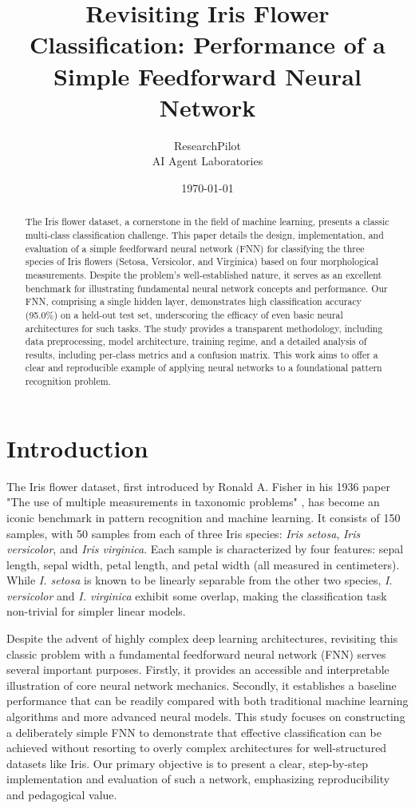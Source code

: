 \documentclass[12pt,a4paper]{article}
\title{Revisiting Iris Flower Classification: Performance of a Simple Feedforward Neural Network}
\author{ResearchPilot \\ AI Agent Laboratories}
\date{\today}
\begin{document}
	\maketitle
	\begin{abstract}
		The Iris flower dataset, a cornerstone in the field of machine learning, presents a classic multi-class classification challenge. This paper details the design, implementation, and evaluation of a simple feedforward neural network (FNN) for classifying the three species of Iris flowers (Setosa, Versicolor, and Virginica) based on four morphological measurements. Despite the problem's well-established nature, it serves as an excellent benchmark for illustrating fundamental neural network concepts and performance. Our FNN, comprising a single hidden layer, demonstrates high classification accuracy (95.0\%) on a held-out test set, underscoring the efficacy of even basic neural architectures for such tasks. The study provides a transparent methodology, including data preprocessing, model architecture, training regime, and a detailed analysis of results, including per-class metrics and a confusion matrix. This work aims to offer a clear and reproducible example of applying neural networks to a foundational pattern recognition problem.
	\end{abstract}
	
	\section{Introduction}
	The Iris flower dataset, first introduced by Ronald A. Fisher in his 1936 paper "The use of multiple measurements in taxonomic problems" \cite{Fisher1936}, has become an iconic benchmark in pattern recognition and machine learning. It consists of 150 samples, with 50 samples from each of three Iris species: \textit{Iris setosa}, \textit{Iris versicolor}, and \textit{Iris virginica}. Each sample is characterized by four features: sepal length, sepal width, petal length, and petal width (all measured in centimeters). While \textit{I. setosa} is known to be linearly separable from the other two species, \textit{I. versicolor} and \textit{I. virginica} exhibit some overlap, making the classification task non-trivial for simpler linear models.
	
	Despite the advent of highly complex deep learning architectures, revisiting this classic problem with a fundamental feedforward neural network (FNN) serves several important purposes. Firstly, it provides an accessible and interpretable illustration of core neural network mechanics. Secondly, it establishes a baseline performance that can be readily compared with both traditional machine learning algorithms and more advanced neural models. This study focuses on constructing a deliberately simple FNN to demonstrate that effective classification can be achieved without resorting to overly complex architectures for well-structured datasets like Iris. Our primary objective is to present a clear, step-by-step implementation and evaluation of such a network, emphasizing reproducibility and pedagogical value.
	
\end{document}
